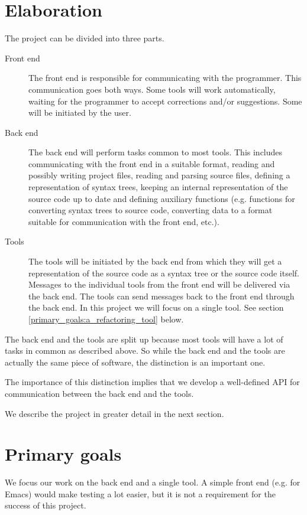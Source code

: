 \documentclass[a4paper,oneside]{article}
\begin{document}
\section{Elaboration}
The project can be divided into three parts.
\begin{description}
\item[Front end] The front end is responsible for communicating with the programmer. This
communication goes both ways. Some tools will work automatically, waiting for the programmer to
accept corrections and/or suggestions. Some will be initiated by the user.
\item[Back end] The back end will perform tasks common to most tools. This includes communicating
with the front end in a suitable format, reading and possibly writing project files, reading and
parsing source files, defining a representation of syntax trees, keeping an internal representation
of the source code up to date and defining auxiliary functions (e.g. functions for converting syntax
trees to source code, converting data to a format suitable for communication with the front end,
etc.).
\item[Tools] The tools will be initiated by the back end from which they will get a representation
of the source code as a syntax tree or the source code itself. Messages to the individual tools from
the front end will be delivered via the back end. The tools can send messages back to the front end
through the back end. In this project we will focus on a single tool. See section
\ref{primary_goals:a_refactoring_tool} below.
\end{description}

The back end and the tools are split up because most tools will have a lot of tasks in common as
described above.  So while the back end and the tools are actually the same piece of software, the
distinction is an important one.

The importance of this distinction implies that we develop a well-defined API for communication
between the back end and the tools.

We describe the project in greater detail in the next section.

\section{Primary goals}
We focus our work on the back end and a single tool. A simple front end (e.g. for Emacs) would make
testing a lot easier, but it is not a requirement for the success of this project.
\end{document}
